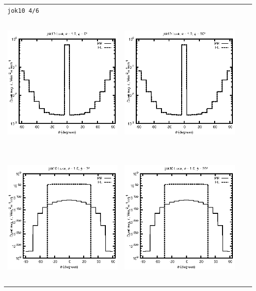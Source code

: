 \documentclass[10pt,a4paper]{article}
\begin{document}
\begin{adjustwidth}{-1.2in}{-1.2in}
\begin{tabular}{c c c c}
\multicolumn{4}{l}{\texttt{jok10 4/6}} \\
\includegraphics[height=7cm]{../eps/jok10_Lu_a_fwd.eps} &
\includegraphics[height=7cm]{../eps/jok10_Lu_a_cross.eps}\\
\includegraphics[height=7cm]{../eps/jok10_Lu_w_fwd.eps} &
\includegraphics[height=7cm]{../eps/jok10_Lu_w_cross.eps} \\

\end{tabular}
\end{adjustwidth}
\end{document}
